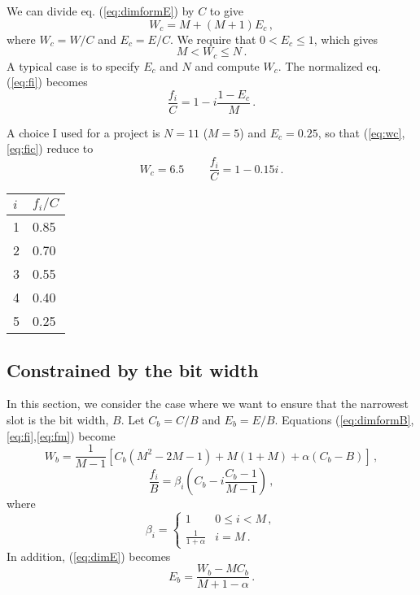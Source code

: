 \documentclass[12pt,final]{article}
\begin{document}
We can divide eq. (\ref{eq:dimformE}) by $C$ to give
\begin{equation}
  \label{eq:wc}
  W_c = M + (M + 1) E_c\,,
\end{equation}
where $W_c = W/C$ and $E_c = E / C$.  We require that $0 < E_c \le 1$,
which gives
\begin{equation}
  M < W_c \le N\,.
\end{equation}
A typical case is to specify $E_c$ and $N$ and compute $W_c$. The
normalized eq. (\ref{eq:fi}) becomes
\begin{equation}
  \label{eq:fic}
  \frac{f_i}{C} = 1 - i \frac{1 - E_c}{M}\,.
\end{equation}

A choice I used for a project is $N = 11$ ($M=5$) and $E_c = 0.25$, so that
(\ref{eq:wc},\ref{eq:fic}) reduce to
\begin{equation}
  W_c = 6.5\, \qquad
  \frac{f_i}{C} = 1 - 0.15 i\,.
\end{equation}
\begin{center}
\begin{tabular}{l|l}
  $i$ & $f_i/C$ \\
  \hline
  1 & 0.85 \\
  2 & 0.70 \\
  3 & 0.55 \\
  4 & 0.40 \\
  5 & 0.25 \\
  \hline
\end{tabular}
\end{center}

\subsection{Constrained by the bit width}

In this section, we consider the case where we want to ensure that the
narrowest slot is the bit width, $B$.
Let $C_b = C / B$ and $E_b = E / B$.  Equations
(\ref{eq:dimformB},\ref{eq:fi},\ref{eq:fm}) become
\begin{equation}
  \label{eq:wb}
  W_b = \frac{1}{M-1} \left[C_b(M^2 - 2 M -1) + M (1+M) + 
    \alpha (C_b - B)\right]\,,
\end{equation}
\begin{equation}
  \label{eq:fib}
  \frac{f_i}{B} =  \beta_i \left(C_b - i \frac{C_b - 1}{M-1}\right)\,,
\end{equation}
where
\begin{equation}
  \beta_i = 
  \begin{cases}
      1 & 0 \le i < M\,,\\
      \frac{1}{1 + \alpha} & i = M\,.
  \end{cases}
\end{equation}
In addition, (\ref{eq:dimE}) becomes
\begin{equation}
  \label{eq:eb}
  E_b = \frac{W_b - M C_b}{M + 1 - \alpha}\,.
\end{equation}
\end{document}
